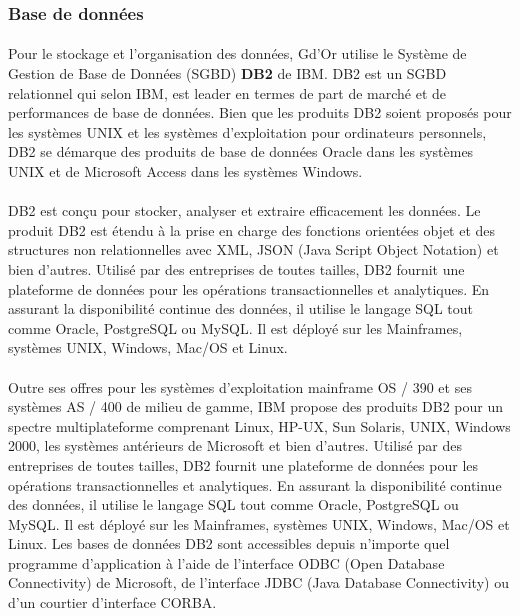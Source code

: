       \subsubsection{Base de donn\'ees}
	\paragraph{}
	  Pour le stockage et l'organisation des donn\'ees, Gd'Or utilise le Syst\`eme de Gestion de Base de Donn\'ees (SGBD) \textbf{DB2} de IBM.
	  DB2 est un SGBD relationnel qui selon IBM, est leader en termes de part de marché et de performances de base de données. Bien que les produits DB2 soient proposés pour les systèmes UNIX et les systèmes d’exploitation pour ordinateurs personnels, DB2 se démarque des produits de base de données Oracle dans les systèmes UNIX et de Microsoft Access dans les systèmes Windows.

	\paragraph{}
	  DB2 est conçu pour stocker, analyser et extraire efficacement les données. Le produit DB2 est étendu à la prise en charge des fonctions orientées objet et des structures non relationnelles avec XML, JSON (Java Script Object Notation) et bien d'autres. Utilisé par des entreprises de toutes tailles, DB2 fournit une plateforme de données pour les opérations transactionnelles et analytiques. En assurant la disponibilité continue des données, il utilise le langage SQL tout comme Oracle, PostgreSQL ou MySQL. Il est déployé sur les Mainframes, systèmes UNIX, Windows, Mac/OS et Linux.

	\paragraph{}
	  Outre ses offres pour les systèmes d’exploitation mainframe OS / 390 et ses systèmes AS / 400 de milieu de gamme, IBM propose des produits DB2 pour un spectre multiplateforme comprenant Linux, HP-UX, Sun Solaris, UNIX, Windows 2000, les systèmes antérieurs de Microsoft et bien d'autres. Utilisé par des entreprises de toutes tailles, DB2 fournit une plateforme de données pour les opérations transactionnelles et analytiques. En assurant la disponibilité continue des données, il utilise le langage SQL tout comme Oracle, PostgreSQL ou MySQL. Il est déployé sur les Mainframes, systèmes UNIX, Windows, Mac/OS et Linux. Les bases de données DB2 sont accessibles depuis n'importe quel programme d'application à l'aide de l'interface ODBC (Open Database Connectivity) de Microsoft, de l'interface JDBC (Java Database Connectivity) ou d'un courtier d'interface CORBA.

